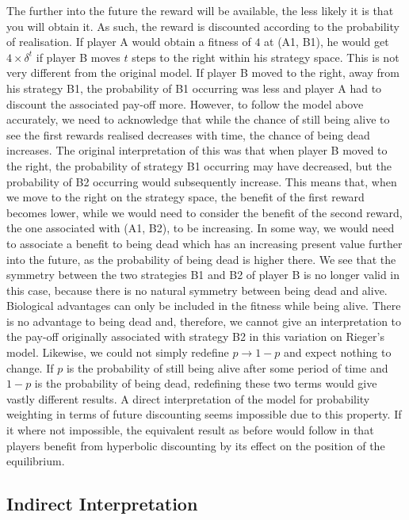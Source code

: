 \documentclass[a4paper,10pt]{article}
\numberwithin{equation}{section}
\begin{document}
The further into the future the reward will be available, the less likely it is that you will obtain it. As such, the reward is discounted according to the probability of realisation. If player A would obtain a fitness of $4$ at (A1, B1), he would get $4 \times \delta ^{t}$ if player B moves $t$ steps to the right within his strategy space. This is not very different from the original model. If player B moved to the right, away from his strategy B1, the probability of B1 occurring was less and player A had to discount the associated pay-off more. However, to follow the model above accurately, we need to acknowledge that while the chance of still being alive to see the first rewards realised decreases with time, the chance of being dead increases. The original interpretation of this was that when player B moved to the right, the probability of strategy B1 occurring may have decreased, but the probability of B2 occurring would subsequently increase. This means that, when we move to the right on the strategy space, the benefit of the first reward becomes lower, while we would need to consider the benefit of the second reward, the one associated with (A1, B2), to be increasing. In some way, we would need to associate a benefit to being dead which has an increasing present value further into the future, as the probability of being dead is higher there. We see that the symmetry between the two strategies B1 and B2 of player B is no longer valid in this case, because there is no natural symmetry between being dead and alive. Biological advantages can only be included in the fitness while being alive. There is no advantage to being dead and, therefore, we cannot give an interpretation to the pay-off originally associated with strategy B2 in this variation on Rieger's model. Likewise, we could not simply redefine $p \to 1-p$ and expect nothing to change. If $p$ is the probability of still being alive after some period of time and $1-p$ is the probability of being dead, redefining these two terms would give vastly different results. A direct interpretation of the model for probability weighting in terms of future discounting seems impossible due to this property. If it where not impossible, the equivalent result as before would follow in that players benefit from hyperbolic discounting by its effect on the position of the equilibrium.


\subsection{Indirect Interpretation}
\label{sec:Indirect Interpretation}
\end{document}
